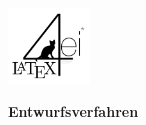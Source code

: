 \documentclass[6pt,a4paper]{scrartcl}
\renewcommand{\emph}[1]{\textsf{\textbf{#1}}}
\begin{document}
\newpage
\begin{multicols}{3}

\parbox{2.3cm}{
	\includegraphics[height=2cm]{./img/Logo.pdf}
}
\parbox{4cm}{
	\emph{\huge{Entwurfsverfahren}}
}

\setcounter{section}{0}			%


\end{multicols}
\end{document}
